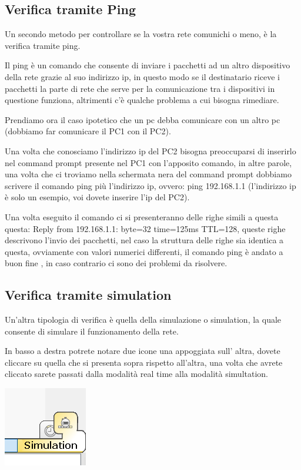 \subsection{Verifica tramite Ping}
Un secondo metodo per controllare se la vostra rete comunichi o meno, è la verifica tramite ping.

Il ping è un comando che consente di inviare i pacchetti ad un altro dispositivo della rete grazie al suo indirizzo ip, in questo modo se il destinatario riceve i pacchetti la parte di rete che serve per la comunicazione tra i dispositivi in questione funziona, altrimenti c'è qualche problema a cui bisogna rimediare.

Prendiamo ora il caso ipotetico che un pc debba comunicare con un altro pc (dobbiamo far comunicare il PC1 con il PC2).

Una volta che conosciamo l'indirizzo ip del PC2 bisogna preoccuparsi di inserirlo nel command prompt presente nel PC1 con l’apposito comando, in altre parole, una volta che ci troviamo nella schermata nera del command prompt dobbiamo scrivere il comando ping più l’indirizzo ip, ovvero: ping 192.168.1.1 (l'indirizzo ip è solo un esempio, voi dovete inserire l'ip del PC2).

Una volta eseguito il comando ci si presenteranno delle righe simili a questa questa: Reply from 192.168.1.1: byte=32 time=125ms TTL=128, queste righe descrivono l'invio dei pacchetti, nel caso la struttura delle righe sia identica a questa, ovviamente con valori numerici differenti, il comando ping è andato a buon fine , in caso contrario ci sono dei problemi da risolvere.

\subsection{Verifica tramite simulation}
Un'altra tipologia di verifica è quella della simulazione o simulation, la quale consente di simulare il funzionamento della rete.

In basso a destra potrete notare due icone una appoggiata sull' altra, dovete cliccare su quella che si presenta sopra rispetto all'altra, una volta che avrete cliccato sarete passati dalla modalità real time alla modalità simultation.

\begin{center}
    \includegraphics[width=0.3\linewidth]{images/04.debugging-rete/04.png}
\end{center}

